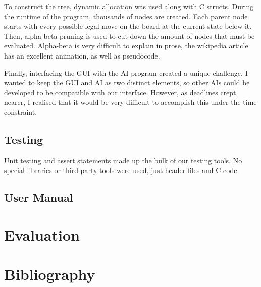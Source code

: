 \documentclass[letterpaper,12pt]{article}
\begin{document}
To construct the tree, dynamic allocation was used along with C structs. During the runtime of the program, thousands of nodes are created. Each parent node starts with every possible legal move on the board at the current state below it. Then, alpha-beta pruning is used to cut down the amount of nodes that must be evaluated. Alpha-beta is very difficult to explain in prose, the wikipedia article has an excellent animation, as well as pseudocode.

Finally, interfacing the GUI with the AI program created a unique challenge. I wanted to keep the GUI and AI as two distinct elements, so other AIs could be developed to be compatible with our interface. However, as deadlines crept nearer, I realised that it would be very difficult to accomplish this under the time constraint.

\subsection{Testing}

Unit testing and assert statements made up the bulk of our testing tools. No special libraries or third-party tools were used, just header files and C code.

\subsection{User Manual}

\section{Evaluation}

\section{Bibliography}
\end{document}
